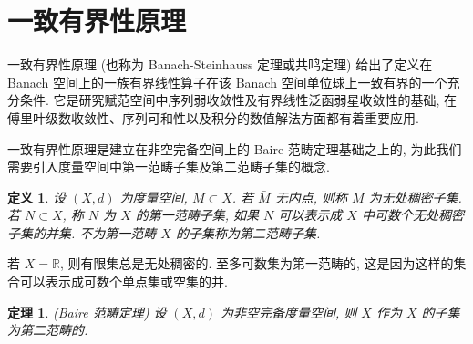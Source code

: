 \documentclass[openany]{ctexbook}
\theoremstyle{kaiti}
\newtheorem{definition}{定义}[section]
\newtheorem{theorem}{定理}[section]
\theoremstyle{normal}
\begin{document}
\section{一致有界性原理}

一致有界性原理 (也称为 Banach-Steinhauss 定理或共鸣定理) 给出了定义在 Banach 空间上的一族有界线性算子在该 Banach 空间单位球上一致有界的一个充分条件. 它是研究赋范空间中序列弱收敛性及有界线性泛函弱星收敛性的基础, 在傅里叶级数收敛性、序列可和性以及积分的数值解法方面都有着重要应用.

一致有界性原理是建立在非空完备空间上的 Baire 范畴定理基础之上的, 为此我们需要引入度量空间中第一范畴子集及第二范畴子集的概念.

\begin{definition}
设 $(X, d)$ 为度量空间, $M \subset X$. 若 $\bar{M}$ 无内点, 则称 $M$ 为无处稠密子集. 若 $N \subset X$, 称 $N$ 为 $X$ 的第一范畴子集, 如果 $N$ 可以表示成 $X$ 中可数个无处稠密子集的并集. 不为第一范畴 $X$ 的子集称为第二范畴子集.
\end{definition}

若 $X=\mathbb{R}$, 则有限集总是无处稠密的. 至多可数集为第一范畴的, 这是因为这样的集合可以表示成可数个单点集或空集的并.

\begin{theorem}
  (Baire 范畴定理) 设 $(X, d)$ 为非空完备度量空间, 则 $X$ 作为 $X$ 的子集为第二范畴的.
\end{theorem}
\end{document}
